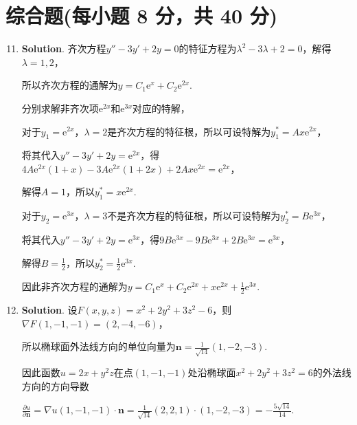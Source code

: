 \documentclass[../Main.tex]{subfiles}
\begin{document}
\section{综合题(每小题 8 分，共 40 分)}
\begin{enumerate}
    \setcounter{enumi}{10}

    \item \textbf{Solution}. 齐次方程$y''-3y'+2y = 0$的特征方程为$\lambda^{2}-3\lambda
              +2=0$，解得$\lambda = 1,2$，

          所以齐次方程的通解为$y = C_{1}\mathrm{e}^{x}+ C_{2}\mathrm{e}^{2x}$.

          分别求解非齐次项$\mathrm{e}^{2x}$和$\mathrm{e}^{3x}$对应的特解，

          对于$y_{1}=\mathrm{e}^{2x}$，$\lambda = 2$是齐次方程的特征根，所以可设特解为$y
                  _{1}^{*}= Ax\mathrm{e}^{2x}$，

          将其代入$y''-3y'+2y = \mathrm{e}^{2x}$，得$4A\mathrm{e}^{2x}(1+x)-3A\mathrm{e}
              ^{2x}(1+2x)+2A x\mathrm{e}^{2x}= \mathrm{e}^{2x}$，

          解得$A = 1$，所以$y_{1}^{*}= x\mathrm{e}^{2x}$.

          对于$y_{2}=\mathrm{e}^{3x}$，$\lambda = 3$不是齐次方程的特征根，所以可设特解为$y
                  _{2}^{*}= B\mathrm{e}^{3x}$，

          将其代入$y''-3y'+2y = \mathrm{e}^{3x}$，得$9B\mathrm{e}^{3x}-9B\mathrm{e}^{3x}
              +2B\mathrm{e}^{3x}= \mathrm{e}^{3x}$，

          解得$B = \frac{1}{2}$，所以$y_{2}^{*}= \frac{1}{2}\mathrm{e}^{3x}$.

          因此非齐次方程的通解为$y = C_{1}\mathrm{e}^{x}+ C_{2}\mathrm{e}^{2x}+ x\mathrm{e}
              ^{2x}+ \frac{1}{2}\mathrm{e}^{3x}$.

    \item \textbf{Solution}. 设$F(x,y,z) = x^{2}+2y^{2}+3z^{2}-6$，则$\nabla F(1,
              -1,-1) = (2, -4, -6)$，

          所以椭球面外法线方向的单位向量为$\boldsymbol{n}= \frac{1}{\sqrt{14}}(1, -2,
              -3)$.

          因此函数$u=2x+y^{2} z$在点$(1,-1,-1)$处沿椭球面$x^{2}+2y^{2}+3z^{2}=6$的外法线方向的方向导数

          $\frac{\partial u}{\partial \boldsymbol{n}}= \nabla u(1,-1,-1)\cdot \boldsymbol
              {n}= \frac{1}{\sqrt{14}}(2, 2, 1)\cdot (1, -2, -3) = -\frac{5\sqrt{14}}{14}$.


\end{enumerate}
\end{document}
